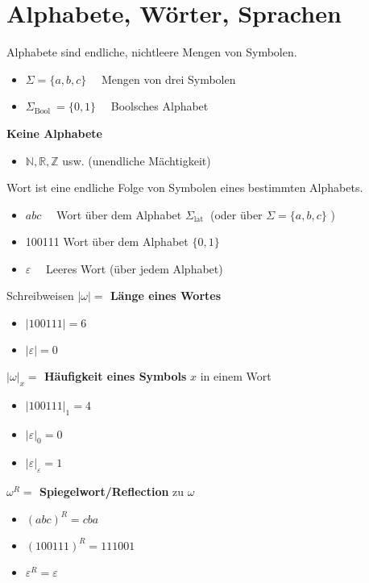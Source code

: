 \section*{Alphabete, Wörter, Sprachen}

\begin{definition}{Alphabete}
    sind endliche, nichtleere Mengen von Symbolen.

\begin{itemize}
  \item $\Sigma=\{a, b, c\} \quad$ Mengen von drei Symbolen
  \item $\Sigma_{\text {Bool }}=\{0,1\} \quad$ Boolsches Alphabet
\end{itemize}
\textbf{Keine Alphabete}
\begin{itemize}
  \item $\mathbb{N}, \mathbb{R}, \mathbb{Z}$ usw. (unendliche Mächtigkeit)
\end{itemize}
\end{definition}

\begin{definition}{Wort}
    ist eine endliche Folge von Symbolen eines bestimmten Alphabets.
    \begin{itemize}
    \item $a b c \quad$ Wort über dem Alphabet $\Sigma_{\text {lat }}$ (oder über $\Sigma=\{a, b, c\}$ )
    \item 100111 Wort über dem Alphabet $\{0,1\}$
    \item $\varepsilon \quad$ Leeres Wort (über jedem Alphabet)
    \end{itemize}
\end{definition}

\begin{definition}{Schreibweisen}
    \textbf{$|\omega|=$ Länge eines Wortes}
    \begin{itemize}
    \item $|100111|=6$
    \item $|\varepsilon|=0$
    \end{itemize}

    \textbf{$|\omega|_{x}=$ Häufigkeit eines Symbols} $x$ in einem Wort
    \begin{itemize}
    \item $|100111|_{1}=4$
    \item $|\varepsilon|_{0}=0$
    \item $|\varepsilon|_{\varepsilon}=1$
    \end{itemize}

    \textbf{$\omega^{R}=$ Spiegelwort/Reflection} zu $\omega$
    \begin{itemize}
    \item $(a b c)^{R}=c b a$
    \item $(100111)^{R}=111001$
    \item $\varepsilon^{R}=\varepsilon$
    \end{itemize}
\end{definition}

